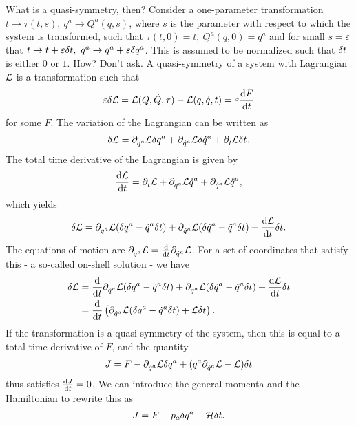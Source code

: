 What is a quasi-symmetry, then? Consider a one-parameter transformation $t\to\tau(t, s),\ q^{a}\to Q^{a}(q, s)$, where $s$ is the parameter with respect to which the system is transformed, such that $\tau(t, 0) = t,\ Q^{a}(q, 0) = q^{a}$ and for small $s = \varepsilon$ that $t\to t + \varepsilon\delta t,\ q^{a}\to q^{a} + \varepsilon\delta q^{a}$. This is assumed to be normalized such that $\delta t$ is either $0$ or $1$. How? Don't ask. A quasi-symmetry of a system with Lagrangian $\mathcal{L}$ is a transformation such that
\begin{align*}
	\varepsilon\delta \mathcal{L} = \mathcal{L}(Q, \dot{Q}, \tau) - \mathcal{L}(q, \dot{q}, t) = \varepsilon\dv{F}{t}
\end{align*}
for some $F$. The variation of the Lagrangian can be written as
\begin{align*}
	\delta \mathcal{L} = \partial^{}_{q^{a}}\mathcal{L}\delta q^{a} + \partial^{}_{\dot{q}^{a}}\mathcal{L}\delta \dot{q}^{a} + \partial^{}_{t}\mathcal{L}\delta t.
\end{align*}
The total time derivative of the Lagrangian is given by
\begin{align*}
	\dv{\mathcal{L}}{t} = \partial^{}_{t}\mathcal{L} + \partial^{}_{q^{a}}\mathcal{L}\dot{q}^{a} + \partial^{}_{\dot{q}^{a}}\mathcal{L}\ddot{q}^{a},
\end{align*}
which yields
\begin{align*}
	\delta \mathcal{L} = \partial^{}_{q^{a}}\mathcal{L}(\delta q^{a} - \dot{q}^{a}\delta t) + \partial^{}_{\dot{q}^{a}}\mathcal{L}(\delta \dot{q}^{a} - \ddot{q}^{a}\delta t) + \dv{\mathcal{L}}{t}\delta t.
\end{align*}
The equations of motion are $\partial^{}_{q^{a}}\mathcal{L} = \dv{t}\partial^{}_{\dot{q}^{a}}\mathcal{L}$. For a set of coordinates that satisfy this - a so-called on-shell solution - we have
\begin{align*}
	\delta \mathcal{L} &= \dv{t}\partial^{}_{\dot{q}^{a}}\mathcal{L}(\delta q^{a} - \dot{q}^{a}\delta t) + \partial^{}_{\dot{q}^{a}}\mathcal{L}(\delta \dot{q}^{a} - \ddot{q}^{a}\delta t) + \dv{\mathcal{L}}{t}\delta t \\
	           &= \dv{t}\left(\partial^{}_{\dot{q}^{a}}\mathcal{L}(\delta q^{a} - \dot{q}^{a}\delta t) + \mathcal{L}\delta t\right).
\end{align*}
If the transformation is a quasi-symmetry of the system, then this is equal to a total time derivative of $F$, and the quantity
\begin{align*}
	J = F - \partial^{}_{\dot{q}^{a}}\mathcal{L}\delta q^{a} + (\dot{q}^{a}\partial^{}_{\dot{q}^{a}}\mathcal{L} - \mathcal{L})\delta t
\end{align*}
thus satisfies $\dv{J}{t} = 0$. We can introduce the general momenta and the Hamiltonian to rewrite this as
\begin{align*}
	J = F - p_{a}\delta q^{a} + \mathcal{H}\delta t.
\end{align*}

